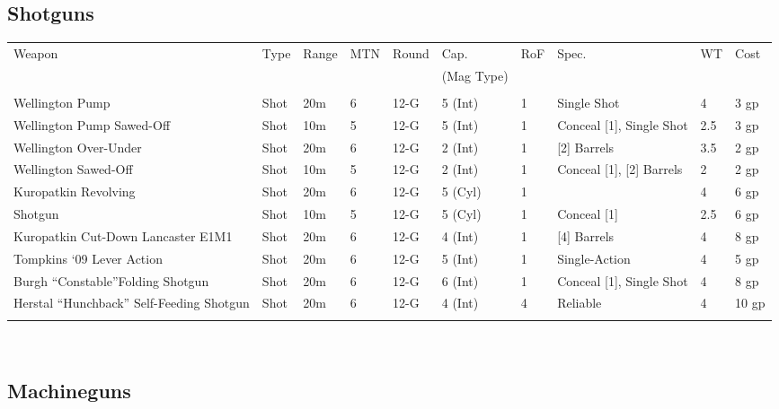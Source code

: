 \documentclass[a4paper, twocolumn, openany]{book}
\begin{document}
{{	\subsection{Shotguns}

	{\centering
	\begin{tabular}{p{2.5cm}lllp{2cm}llp{2.1cm}ll}
	Weapon & Type & Range & MTN & Round & Cap. & RoF & Spec. & WT & Cost\\ 
	&&&&& (Mag Type) \\ \hline \\
	Wellington Pump 							& Shot & 20m & 6 & 12-G & 5 (Int) & 1 & Single Shot 				& 4 	& 3 gp \\
	Wellington Pump Sawed-Off 					& Shot & 10m & 5 & 12-G & 5 (Int) & 1 & Conceal [1], Single Shot 	& 2.5 	& 3 gp \\
	Wellington Over-Under 						& Shot & 20m & 6 & 12-G & 2 (Int) & 1 & [2] Barrels 				& 3.5 	& 2 gp \\
	Wellington Sawed-Off 						& Shot & 10m & 5 & 12-G & 2 (Int) & 1 & Conceal [1], [2] Barrels 	& 2 	& 2 gp \\
	Kuropatkin Revolving 						& Shot & 20m & 6 & 12-G & 5 (Cyl) & 1 &  							& 4 	& 6 gp \\
	Shotgun 									& Shot & 10m & 5 & 12-G & 5 (Cyl) & 1 & Conceal [1] 				& 2.5 	& 6 gp \\
	Kuropatkin Cut-Down Lancaster E1M1 			& Shot & 20m & 6 & 12-G & 4 (Int) & 1 & [4] Barrels 				& 4 	& 8 gp \\
	Tompkins ‘09 Lever Action 					& Shot & 20m & 6 & 12-G & 5 (Int) & 1 & Single-Action 				& 4 	& 5 gp \\
	Burgh “Constable”Folding Shotgun 			& Shot & 20m & 6 & 12-G & 6 (Int) & 1 & Conceal [1], Single Shot 	& 4 	& 8 gp \\
	Herstal “Hunchback” Self-Feeding Shotgun 	& Shot & 20m & 6 & 12-G & 4 (Int) & 4 & Reliable 					& 4 	& 10 gp \\
	\\ \hline
	\end{tabular}\\[2\baselineskip] }

	\subsection{Machineguns}

}}
\end{document}
